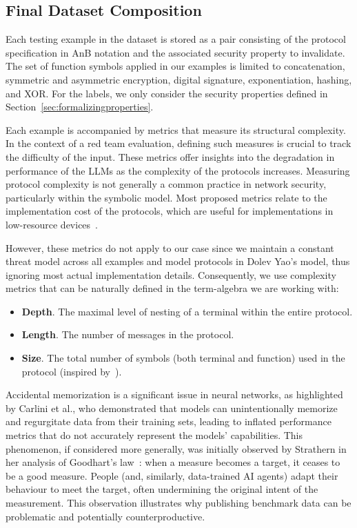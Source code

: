 \subsection{Final Dataset Composition}
Each testing example in the dataset is stored as a pair consisting of the protocol specification in AnB notation and the associated security property to invalidate. The set of function symbols applied in our examples is limited to concatenation, symmetric and asymmetric encryption, digital signature, exponentiation, hashing, and XOR. For the labels, we only consider the security properties defined in Section~\ref{sec:formalizingproperties}.

Each example is accompanied by metrics that measure its structural complexity. In the context of a red team evaluation, defining such measures is crucial to track the difficulty of the input. These metrics offer insights into the degradation in performance of the LLMs as the complexity of the protocols increases. Measuring protocol complexity is not generally a common practice in network security, particularly within the symbolic model. Most proposed metrics relate to the implementation cost of the protocols, which are useful for implementations in low-resource devices~\cite{lightweightcrypto}.

However, these metrics do not apply to our case since we maintain a constant threat model across all examples and model protocols in Dolev Yao's model, thus ignoring most actual implementation details. Consequently, we use complexity metrics that can be naturally defined in the term-algebra we are working with:


\begin{itemize}
    \item \textbf{Depth}. The maximal level of nesting of a terminal within the entire protocol.
    \item \textbf{Length}. The number of messages in the protocol.
    \item \textbf{Size}. The total number of symbols (both terminal and function) used in the protocol (inspired by~\cite{ohno2023security}).
\end{itemize}

Accidental memorization is a significant issue in neural networks, as highlighted by Carlini et al.\cite{carlini2019secret}, who demonstrated that models can unintentionally memorize and regurgitate data from their training sets, leading to inflated performance metrics that do not accurately represent the models' capabilities. This phenomenon, if considered more generally, was initially observed by Strathern in her analysis of Goodhart's law~\cite{strathern1997improving}: when a measure becomes a target, it ceases to be a good measure. People (and, similarly, data-trained AI agents) adapt their behaviour to meet the target, often undermining the original intent of the measurement. This observation illustrates why publishing benchmark data can be problematic and potentially counterproductive.

